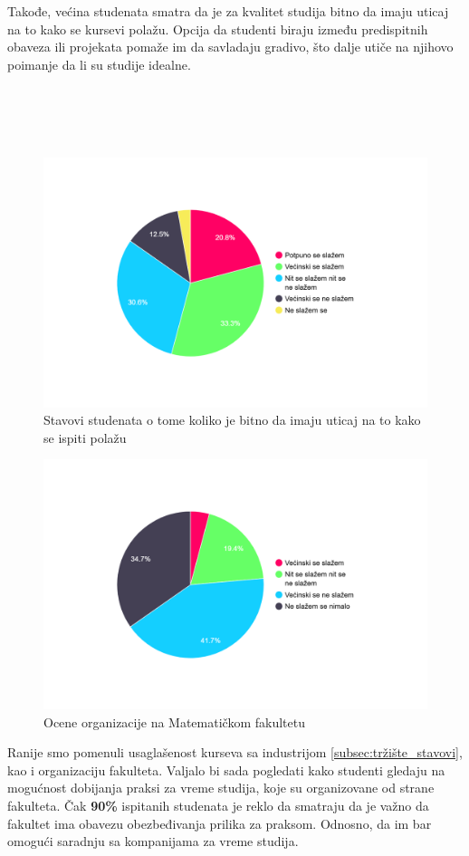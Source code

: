 \documentclass[a4paper]{article}
\begin{document}
{Takođe, većina studenata smatra da je za kvalitet studija bitno da imaju uticaj na to kako se kursevi polažu. Opcija da studenti biraju između predispitnih obaveza ili projekata pomaže im da savladaju gradivo, što dalje utiče na njihovo poimanje da li su studije idealne.\\
\\
\\
\\
\\
\begin{figure}[h!]
\begin{center}
    \includegraphics[width=0.7\linewidth]{Slike/PieChartNacinPolaganja.png}
    \caption{Stavovi studenata o tome koliko je bitno da imaju uticaj na to kako se ispiti polažu}
    \label{fig:uticaj}
\end{center}
\end{figure}

\begin{figure}[h!]
\begin{center}
    \includegraphics[width=0.7\linewidth]{Slike/PieChartOrganizacijaMatfa.png}
    \caption{Ocene organizacije na Matematičkom fakultetu}
    \label{fig:organizacija_matf}
\end{center}
\end{figure}

Ranije smo pomenuli usaglašenost kurseva sa industrijom \ref{subsec:tržište_stavovi}, kao i organizaciju fakulteta. Valjalo bi sada pogledati kako studenti gledaju na mogućnost dobijanja praksi za vreme studija, koje su organizovane od strane fakulteta. Čak \textbf{90\%} ispitanih studenata je reklo da smatraju da je važno da fakultet ima obavezu obezbeđivanja prilika za praksom. Odnosno, da im bar omogući saradnju sa kompanijama za vreme studija.

}
\end{document}
